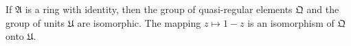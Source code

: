 If $\mathfrak{A}$ is a ring with identity, then the group of quasi-regular elements $\mathfrak{Q}$ and the group of units $\mathfrak{U}$ are isomorphic. The mapping $z \mapsto 1 - z$ is an isomorphism of $\mathfrak{Q}$ onto $\mathfrak{U}$.
